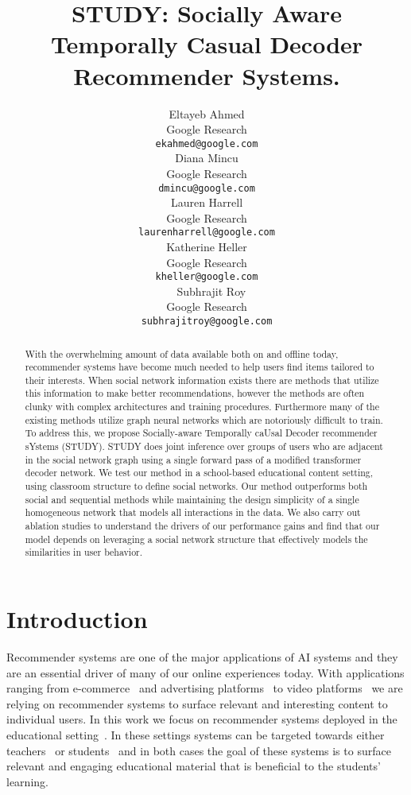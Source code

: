 \documentclass{article}
\title{STUDY: Socially Aware Temporally Casual Decoder Recommender Systems. }
\author{%
 Eltayeb Ahmed \\
  Google Research\\
  \texttt{ekahmed@google.com} \\
\And
  Diana Mincu \\
  Google Research \\
  \texttt{dmincu@google.com} \\
\And
  Lauren Harrell\\
  Google Research \\
  \texttt{laurenharrell@google.com} \\
\And
  Katherine Heller \\
  Google Research \\
  \texttt{kheller@google.com} \\
\
\And
    Subhrajit Roy \\
  Google Research \\
  \texttt{subhrajitroy@google.com} \\
}
\begin{document}
\maketitle
%
\begin{abstract}
With the overwhelming amount of data available both on and offline today, recommender systems have become much needed to help users find items tailored to their interests. 
When social network information exists there are methods that utilize this information to make better recommendations, however the methods are often clunky with complex architectures and training procedures. Furthermore many of the existing methods utilize graph neural networks which are notoriously difficult to train. To address this, we propose Socially-aware Temporally caUsal Decoder recommender sYstems (STUDY). STUDY does joint inference over groups of users who are adjacent in the social network graph using a single forward pass of a modified transformer decoder network. We test our method in a school-based educational content setting, using classroom structure to define social networks.  Our method outperforms both social and sequential methods while maintaining the design simplicity of a single homogeneous network that models all interactions in the data. We also carry out ablation studies to understand the drivers of our performance gains and find that our model depends on leveraging a social network structure that effectively models the similarities in user behavior.

\end{abstract}

\section{Introduction}
Recommender systems are one of the major applications of AI systems and they are an essential driver of many of our online experiences today. With applications ranging from e-commerce~\cite{Li2020HierarchicalBG} and advertising platforms~\cite{liu2021neural} to video platforms~\cite{Deldjoo2020} we are relying on recommender systems to surface relevant and interesting content to individual users. 
In this work we focus on recommender systems deployed in the educational setting~\cite{abdi2020complementing}. In these settings systems can be targeted towards either teachers~\cite{dhahri2021review} or students~\cite{bodily2017review} and in both cases the goal of these systems is to surface relevant and engaging educational material that is beneficial to the students' learning.
\end{document}
